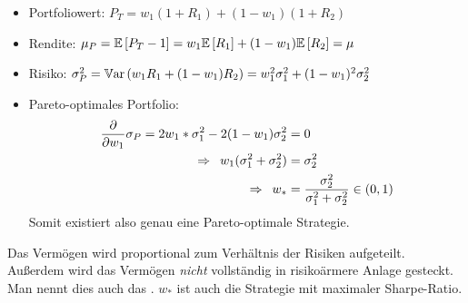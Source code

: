 \begin{description}
	\begin{itemize}
		\item Portfoliowert: $P_T = w_1 (1+R_1) + (1-w_1)(1+R_2)$
		\item Rendite: $\mu_P = \EW[P_T - 1] = w_1 \EW[R_1] + (1-w_1) \EW[R_2] = \mu$
		\item Risiko: $\sigma_P^2 = \Var[w_1 R_1 + (1-w_1) R_2] = w_1^2 \sigma_1^2 + (1-w_1)^2 \sigma_2^2$
		\item Pareto-optimales Portfolio:
		\begin{equation*}
			\begin{aligned}
			\partdiff{w_1} \sigma_P = 2w_1 * \sigma_1^2 - 2(1-w_1)\sigma_2^2 &= 0 \\
			\follows w_1 ( \sigma_1^2 + \sigma_2^2) &= \sigma_2^2 \\
			\follows w_\ast &= \frac{\sigma_2^2}{\sigma_1^2 + \sigma_2^2} \in (0,1)
			\end{aligned}
		\end{equation*}
		Somit existiert also genau eine Pareto-optimale Strategie.
	\end{itemize}
	Das Vermögen wird proportional zum Verhältnis der Risiken aufgeteilt. Außerdem wird das Vermögen \textit{nicht} vollständig in risikoärmere Anlage gesteckt. Man nennt dies auch das . $w_\ast$ ist auch die Strategie mit maximaler Sharpe-Ratio.
\end{description}